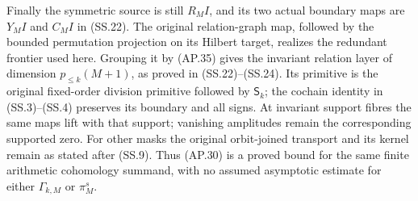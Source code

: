 Finally the symmetric source is still \(R_MI\), and its two
actual boundary maps are \(Y_MI\) and \(C_MI\) in
(SS.22).  The original relation-graph map, followed by the bounded
permutation projection on its Hilbert target, realizes the redundant
frontier used here.  Grouping it by (AP.35) gives the invariant
relation layer of dimension \(p_{\le k}(M+1)\), as proved
in (SS.22)--(SS.24).  Its primitive is the original fixed-order
division primitive followed by \(\mathsf S_k\); the cochain
identity in (SS.3)--(SS.4) preserves its boundary and all signs.
At invariant support fibres the same maps lift with that support;
vanishing amplitudes remain the corresponding supported zero.
For other masks the original orbit-joined transport and its kernel
remain as stated after (SS.9).  Thus (AP.30) is a proved bound
for the same finite arithmetic cohomology summand, with no assumed
asymptotic estimate for either \(\Gamma_{k,M}\) or
\(\pi_M^s\).
